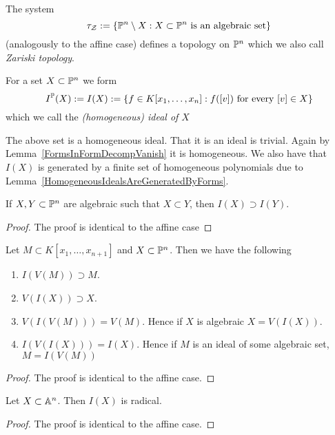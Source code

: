 \begin{remark}
    The system 
    $$\tau_\mathcal{Z} := \left\{ \mathbb{P}^n\setminus X : X\subset \mathbb{P}^n \text{ is an algebraic set} \right\}$$
    (analogously to the affine case) defines a topology on $\mathbb{P}^n$ which we also call \textit{Zariski topology}.
\end{remark}
    \begin{definition}
        For a set $X\subset \mathbb{P}^n$ we form 
        $$I^{\mathbb{P}}(X):=I(X):=\{ f\in K[x_1,\dots,x_n]: f([v]) \text{ for every } [v]\in X\}$$
        which we call the \textit{(homogeneous) ideal of $X$}
    \end{definition}
    \begin{remark}
        The above set is a homogeneous ideal. That it is an ideal is trivial. Again by Lemma~\ref{FormsInFormDecompVanish} it is homogeneous. We also have that $I(X)$ is generated by a finite set of homogeneous polynomials due to Lemma~\ref{HomogeneousIdealsAreGeneratedByForms}. 
    \end{remark}
    \begin{lemma}
        If $X,Y\subset \mathbb{P}^n$ are algebraic such that $X\subset Y$, then $I(X)\supset I(Y)$.
    \end{lemma}
    \begin{proof}
        The proof is identical to the affine case
    \end{proof}
    \begin{lemma}\label{ProjectiveIdealVanishingSets}
    Let $M \subset K[x_1,\dots,x_{n+1}]$ and $X\subset \mathbb{P}^n$. Then we have the following
    \begin{enumerate}
        \item $I(V(M)) \supset M$.
        \item $V(I(X)) \supset X$.
        \item $V(I(V(M)))=V(M)$. Hence if $X$ is algebraic $X=V(I(X))$.
        \item $I(V(I(X)))=I(X)$. Hence if $M$ is an ideal of some algebraic set, $M= I(V(M))$
    \end{enumerate}
    \end{lemma}
    \begin{proof}
        The proof is identical to the affine case.    
    \end{proof}
    \begin{lemma}
        Let $X\subset \mathbb{A}^n$. Then $I(X)$ is radical. 
    \end{lemma}
    \begin{proof}
        The proof is identical to the affine case.
    \end{proof}
